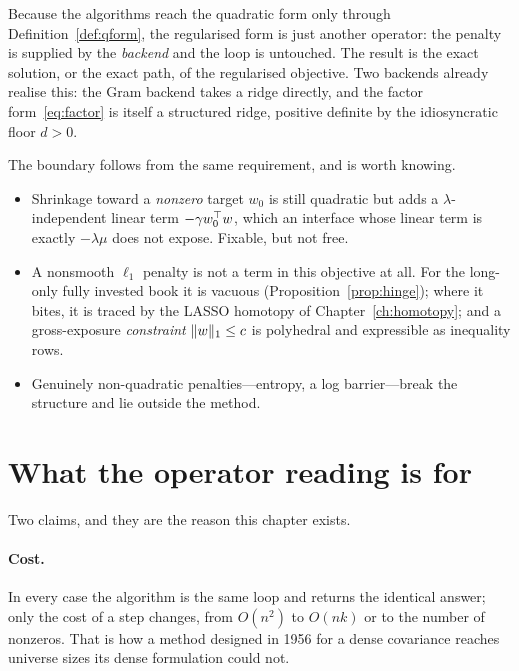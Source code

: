 Because the algorithms reach the quadratic form only through
Definition~\ref{def:qform}, the regularised form is just another operator: the penalty
is supplied by the \emph{backend} and the loop is untouched. The result is the exact
solution, or the exact path, of the regularised objective. Two backends already realise
this: the Gram backend takes a ridge directly, and the factor
form~\eqref{eq:factor} is itself a structured ridge, positive definite by the
idiosyncratic floor $d > 0$.

The boundary follows from the same requirement, and is worth knowing.

\begin{itemize}
\item Shrinkage toward a \emph{nonzero} target $w_0$ is still quadratic but adds a
      $\lambda$-independent linear term $-\gamma w_0^{\top} w$, which an interface whose
      linear term is exactly $-\lambda\mu$ does not expose. Fixable, but not free.
\item A nonsmooth $\ell_1$ penalty is not a term in this objective at all. For the
      long-only fully invested book it is vacuous
      (Proposition~\ref{prop:hinge}); where it bites, it is traced by the LASSO
      homotopy of Chapter~\ref{ch:homotopy}; and a gross-exposure \emph{constraint}
      $\lVert w \rVert_1 \le c$ is polyhedral and expressible as inequality rows.
\item Genuinely non-quadratic penalties---entropy, a log barrier---break the structure
      and lie outside the method.
\end{itemize}

\section{What the operator reading is for}

Two claims, and they are the reason this chapter exists.

\paragraph{Cost.} In every case the algorithm is the same loop and returns the
identical answer; only the cost of a step changes, from $O(n^2)$ to $O(nk)$ or to the
number of nonzeros. That is how a method designed in 1956 for a dense covariance
reaches universe sizes its dense formulation could not.

